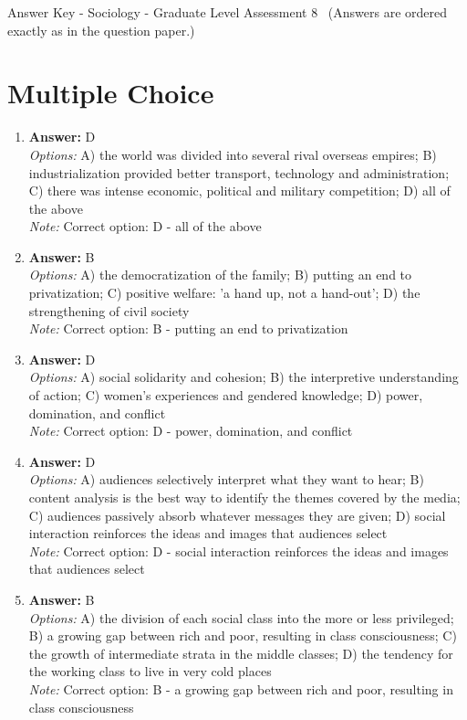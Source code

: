 \documentclass[12pt]{article}
\begin{document}
\begin{center}
Answer Key - Sociology - Graduate Level Assessment 8 \
\small (Answers are ordered exactly as in the question paper.)
\end{center}

\section*{Multiple Choice}
\begin{enumerate}[label=\arabic*.]
\item \textbf{Answer:} D
\\ \textit{Options:} A) the world was divided into several rival overseas empires; B) industrialization provided better transport, technology and administration; C) there was intense economic, political and military competition; D) all of the above
\\ \textit{Note:} Correct option: D - all of the above
\item \textbf{Answer:} B
\\ \textit{Options:} A) the democratization of the family; B) putting an end to privatization; C) positive welfare: 'a hand up, not a hand-out'; D) the strengthening of civil society
\\ \textit{Note:} Correct option: B - putting an end to privatization
\item \textbf{Answer:} D
\\ \textit{Options:} A) social solidarity and cohesion; B) the interpretive understanding of action; C) women's experiences and gendered knowledge; D) power, domination, and conflict
\\ \textit{Note:} Correct option: D - power, domination, and conflict
\item \textbf{Answer:} D
\\ \textit{Options:} A) audiences selectively interpret what they want to hear; B) content analysis is the best way to identify the themes covered by the media; C) audiences passively absorb whatever messages they are given; D) social interaction reinforces the ideas and images that audiences select
\\ \textit{Note:} Correct option: D - social interaction reinforces the ideas and images that audiences select
\item \textbf{Answer:} B
\\ \textit{Options:} A) the division of each social class into the more or less privileged; B) a growing gap between rich and poor, resulting in class consciousness; C) the growth of intermediate strata in the middle classes; D) the tendency for the working class to live in very cold places
\\ \textit{Note:} Correct option: B - a growing gap between rich and poor, resulting in class consciousness
\end{enumerate}
\end{document}
